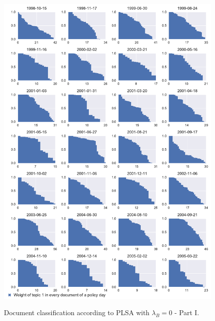 \documentclass[11pt,a4paper,english,oneside]{book}
\numberwithin{equation}{chapter}
\begin{document}
\begin{figure}
	\caption{Document classification according to PLSA with $\lambda_B = 0$ - Part I.}
	\centering
	\includegraphics[scale=0.8]{Images/docsplit01_bgLamb_0_0}
	\label{classdoc01}
\end{figure}
\end{document}

